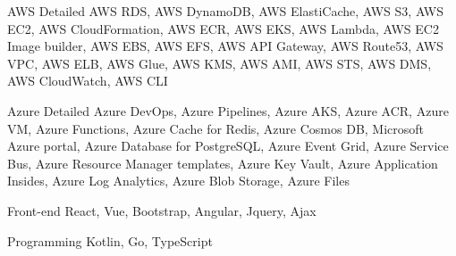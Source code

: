 

\begin{cvskills}

  \cvskill
    {AWS Detailed} %
    {AWS RDS, AWS DynamoDB, AWS ElastiCache, AWS S3, AWS EC2, AWS CloudFormation,
     AWS ECR, AWS EKS, AWS Lambda, AWS EC2 Image builder, AWS EBS, AWS EFS, AWS API Gateway,
      AWS Route53, AWS VPC, AWS ELB, AWS Glue, AWS KMS, AWS AMI, AWS STS, AWS DMS, AWS CloudWatch, AWS CLI} %

  \cvskill
    {Azure Detailed} %
    {Azure DevOps, Azure Pipelines, Azure AKS, Azure ACR, Azure VM, Azure Functions, Azure Cache for Redis,
     Azure Cosmos DB, Microsoft Azure portal, Azure Database for PostgreSQL, Azure Event Grid, Azure Service Bus,
      Azure Resource Manager templates, Azure Key Vault, Azure Application Insides, Azure Log Analytics, Azure Blob Storage, Azure Files} %

  \cvskill
    {Front-end} %
    {React, Vue, Bootstrap, Angular, Jquery, Ajax} %

  \cvskill
    {Programming} %
    {Kotlin, Go, TypeScript} %

\end{cvskills}
